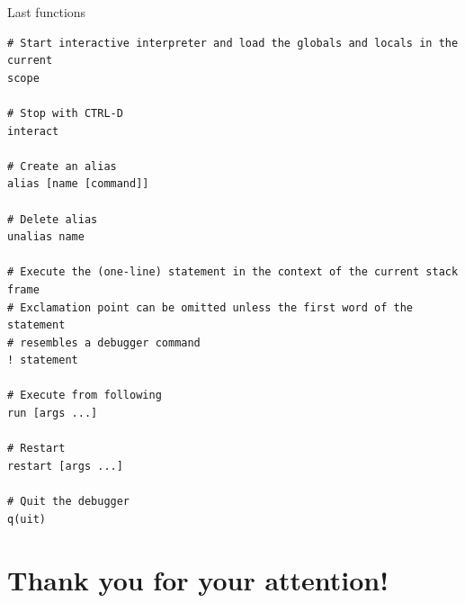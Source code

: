\documentclass[
    size=20pt,
    style=sailor,
    display=slides,
    paper=smartboard,
    orient=landscape,
]{powerdot}
\begin{document}
\begin{slide}[method=file]{Last functions}
\begin{verbatim}
# Start interactive interpreter and load the globals and locals in the current 
scope

# Stop with CTRL-D
interact

# Create an alias
alias [name [command]]

# Delete alias
unalias name

# Execute the (one-line) statement in the context of the current stack frame
# Exclamation point can be omitted unless the first word of the statement 
# resembles a debugger command
! statement

# Execute from following
run [args ...]

# Restart
restart [args ...]

# Quit the debugger
q(uit)
\end{verbatim}
\end{slide}

\section[template=wideslide,tocsection=hidden]{Thank you for your attention!}
\end{document}
